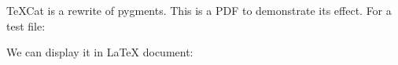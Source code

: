 \documentclass{article}
\begin{document}
\TeX{}Cat is a rewrite of pygments. This is a PDF to demonstrate its effect.
For a test file:

\VerbatimInput[
  numbers=left,
  commandchars=\\\{\},
  frame=single,
  label=test.lua,
]{\mylua}

We can display it in \LaTeX{} document:

\VerbatimInput[
  numbers=left,
  commandchars=\\\{\},
  frame=lines,
  label=test.tex,
]{\mytex}
\end{document}
